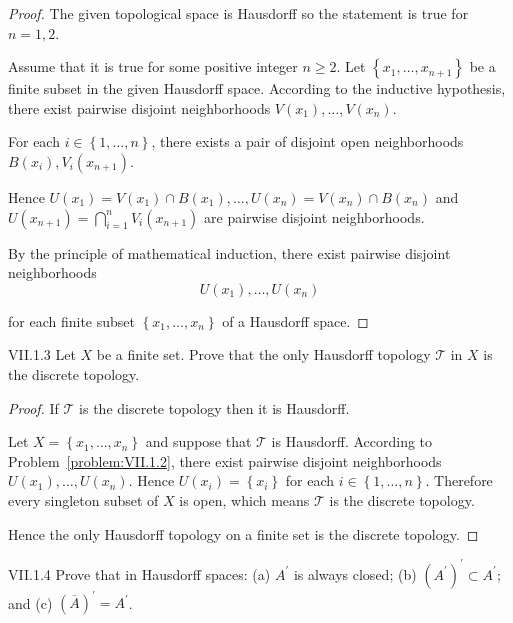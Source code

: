 \begin{proof}
	The given topological space is Hausdorff so the statement is true for \( n = 1, 2 \).

	Assume that it is true for some positive integer \( n \ge 2 \). Let \( \left\{ x_{1}, \ldots, x_{n+1} \right\} \) be a finite subset in the given Hausdorff space. According to the inductive hypothesis, there exist pairwise disjoint neighborhoods \( V(x_{1}), \ldots, V(x_{n}) \).

	For each \( i \in \left\{ 1, \ldots, n \right\} \), there exists a pair of disjoint open neighborhoods \( B(x_{i}), V_{i}(x_{n+1}) \).

	Hence \( U(x_{1}) = V(x_{1}) \cap B(x_{1}), \ldots, U(x_{n}) = V(x_{n}) \cap B(x_{n}) \) and \( U(x_{n+1}) = \bigcap^{n}_{i=1} V_{i}(x_{n+1}) \) are pairwise disjoint neighborhoods.

	By the principle of mathematical induction, there exist pairwise disjoint neighborhoods
	\[
		U(x_{1}), \ldots, U(x_{n})
	\]

	for each finite subset \( \left\{ x_{1}, \ldots, x_{n} \right\} \) of a Hausdorff space.
\end{proof}

\begin{problem}{VII.1.3}\label{problem:VII.1.3}
Let \( X \) be a finite set. Prove that the only Hausdorff topology \( \mathscr{T} \) in \( X \) is the discrete topology.
\end{problem}

\begin{proof}
	If \( \mathscr{T} \) is the discrete topology then it is Hausdorff.

	Let \( X = \left\{ x_{1}, \ldots, x_{n} \right\} \) and suppose that \( \mathscr{T} \) is Hausdorff. According to Problem~\ref{problem:VII.1.2}, there exist pairwise disjoint neighborhoods \( U(x_{1}), \ldots, U(x_{n}) \). Hence \( U(x_{i}) = \left\{ x_{i} \right\} \) for each \( i \in \left\{ 1, \ldots, n \right\} \). Therefore every singleton subset of \( X \) is open, which means \( \mathscr{T} \) is the discrete topology.

	Hence the only Hausdorff topology on a finite set is the discrete topology.
\end{proof}

\begin{problem}{VII.1.4}
Prove that in Hausdorff spaces: (a) \( A^{\prime} \) is always closed; (b) \( {(A^{\prime})}^{\prime} \subset A^{\prime} \); and (c) \( {(\overline{A})}^{\prime} = A^{\prime} \).
\end{problem}

